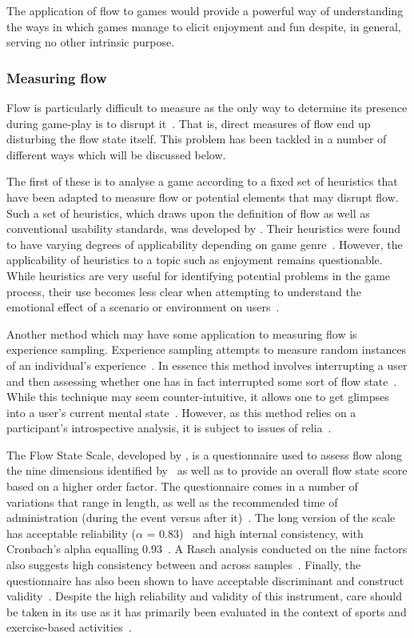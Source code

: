 The application of flow to games would provide a powerful way of understanding the ways in which games manage to elicit enjoyment and fun despite, in general, serving no other intrinsic purpose.

\subsubsection{Measuring flow}
Flow is particularly difficult to measure as the only way to determine its presence during game-play is to disrupt it~\citep{Mand06}. That is, direct measures of flow end up disturbing the flow state itself. This problem has been tackled in a number of different ways which will be discussed below.

The first of these is to analyse a game according to a fixed set of heuristics that have been adapted to measure flow or potential elements that may disrupt flow. Such a set of heuristics, which draws upon the definition of flow as well as conventional usability standards, was developed by \citet{Swee05}. Their heuristics were found to have varying degrees of applicability depending on game genre~\citep{Swee05}. However, the applicability of heuristics to a topic such as enjoyment remains questionable. While heuristics are very useful for identifying potential problems in the game process, their use becomes less clear when attempting to understand the emotional effect of a scenario or environment on users~\citep{Mand06}.

Another method which may have some application to measuring flow is experience sampling. Experience sampling attempts to measure random instances of an individual's experience~\citep{Horm06}. In essence this method involves interrupting a user and then assessing whether one has in fact interrupted some sort of flow state~\citep{Mars05}. While this technique may seem counter-intuitive, it allows one to get glimpses into a user's current mental state~\citep{Horm06}. However, as this method relies on a participant's introspective analysis, it is subject to issues of \gls{relia}~\citep{Blak10}. 

The Flow State Scale, developed by \citet{Jack01}, is a questionnaire used to assess flow along the nine dimensions identified by~\citet{Csik90} as well as to provide an overall flow state score based on a higher order factor. The questionnaire comes in a number of variations that range in length, as well as the recommended time of administration (during the event versus after it)~\citep{Vlac00}. The long version of the scale has acceptable reliability ($\alpha$ = 0.83)~\citep{Jack01} and high internal consistency, with Cronbach's alpha equalling 0.93~\citep{Tene99}. A Rasch analysis conducted on the nine factors also suggests high consistency between and across samples~\citep{Tene99}. Finally, the questionnaire has also been shown to have acceptable discriminant and construct validity~\citep{Mars99}. Despite the high reliability and validity of this instrument, care should be taken in its use as it has primarily been evaluated in the context of sports and exercise-based activities~\citep{Jack01,Vlac00}.

